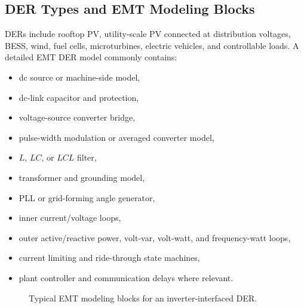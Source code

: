 \documentclass[11pt]{article}
\begin{document}
\subsection{DER Types and EMT Modeling Blocks}
DERs include rooftop PV, utility-scale PV connected at distribution voltages,
BESS, wind, fuel cells, microturbines, electric vehicles, and controllable
loads. A detailed EMT DER model commonly contains:
\begin{itemize}
  \item dc source or machine-side model,
  \item dc-link capacitor and protection,
  \item voltage-source converter bridge,
  \item pulse-width modulation or averaged converter model,
  \item $L$, $LC$, or $LCL$ filter,
  \item transformer and grounding model,
  \item PLL or grid-forming angle generator,
  \item inner current/voltage loops,
  \item outer active/reactive power, volt-var, volt-watt, and frequency-watt loops,
  \item current limiting and ride-through state machines,
  \item plant controller and communication delays where relevant.
\end{itemize}

\begin{figure}[h]
\centering
{}
\caption{Typical EMT modeling blocks for an inverter-interfaced DER.}
\end{figure}
\end{document}
